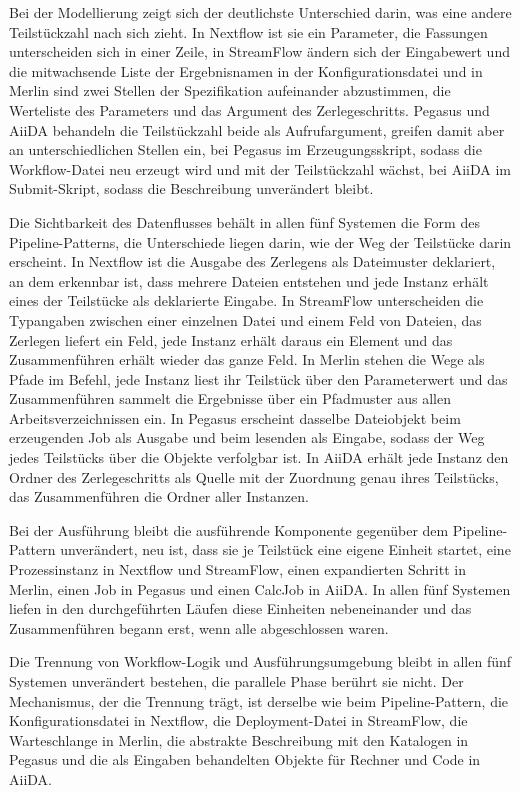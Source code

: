 Bei der Modellierung zeigt sich der deutlichste Unterschied darin,
was eine andere Teilstückzahl nach sich zieht. In Nextflow ist sie
ein Parameter, die Fassungen unterscheiden sich in einer Zeile, in
StreamFlow ändern sich der Eingabewert und die mitwachsende Liste
der Ergebnisnamen in der Konfigurationsdatei und in Merlin sind
zwei Stellen der Spezifikation aufeinander abzustimmen, die
Werteliste des Parameters und das Argument des Zerlegeschritts.
Pegasus und AiiDA behandeln die Teilstückzahl beide als
Aufrufargument, greifen damit aber an unterschiedlichen Stellen ein,
bei Pegasus im Erzeugungsskript, sodass die Workflow-Datei neu
erzeugt wird und mit der Teilstückzahl wächst, bei AiiDA im
Submit-Skript, sodass die Beschreibung unverändert bleibt.

Die Sichtbarkeit des Datenflusses behält in allen fünf Systemen die
Form des Pipeline-Patterns, die Unterschiede liegen darin, wie der
Weg der Teilstücke darin erscheint. In Nextflow ist die Ausgabe des
Zerlegens als Dateimuster deklariert, an dem erkennbar ist, dass
mehrere Dateien entstehen und jede Instanz erhält eines der
Teilstücke als deklarierte Eingabe. In StreamFlow unterscheiden die
Typangaben zwischen einer einzelnen Datei und einem Feld von
Dateien, das Zerlegen liefert ein Feld, jede Instanz erhält daraus
ein Element und das Zusammenführen erhält wieder das ganze Feld. In
Merlin stehen die Wege als Pfade im Befehl, jede Instanz liest ihr
Teilstück über den Parameterwert und das Zusammenführen sammelt die
Ergebnisse über ein Pfadmuster aus allen Arbeitsverzeichnissen ein.
In Pegasus erscheint dasselbe Dateiobjekt beim erzeugenden Job als
Ausgabe und beim lesenden als Eingabe, sodass der Weg jedes
Teilstücks über die Objekte verfolgbar ist. In AiiDA erhält jede
Instanz den Ordner des Zerlegeschritts als Quelle mit der Zuordnung
genau ihres Teilstücks, das Zusammenführen die Ordner aller
Instanzen.

Bei der Ausführung bleibt die ausführende Komponente gegenüber dem
Pipeline-Pattern unverändert, neu ist, dass sie je Teilstück eine
eigene Einheit startet, eine Prozessinstanz in Nextflow und
StreamFlow, einen expandierten Schritt in Merlin, einen Job in
Pegasus und einen CalcJob in AiiDA. In allen fünf Systemen liefen
in den durchgeführten Läufen diese Einheiten nebeneinander und das Zusammenführen begann erst, wenn alle abgeschlossen waren.

Die Trennung von Workflow-Logik und Ausführungsumgebung bleibt in
allen fünf Systemen unverändert bestehen, die parallele Phase
berührt sie nicht. Der Mechanismus, der die Trennung trägt, ist
derselbe wie beim Pipeline-Pattern, die Konfigurationsdatei in
Nextflow, die Deployment-Datei in StreamFlow, die Warteschlange in
Merlin, die abstrakte Beschreibung mit den Katalogen in Pegasus und
die als Eingaben behandelten Objekte für Rechner und Code in AiiDA.

